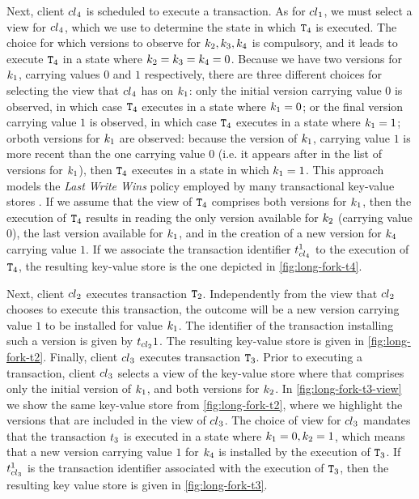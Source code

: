 Next, client ${cl}_4$ is scheduled to execute a transaction. As for ${cl}_1$, 
we must select a view for ${cl}_4$, which we use to determine the state in which $\mathtt{T}_4$ 
is executed. The choice for which versions to observe for $k_2, k_3, k_4$ is compulsory, 
and it leads to execute $\mathtt{T}_4$ in a state where $k_2 = k_3 = k_4 = 0$.
Because we have two versions for $k_1$, carrying values $0$ and $1$ respectively, 
there are three different choices for selecting the view that ${cl}_4$ has on $k_1$: 
only the initial version carrying value $0$ is observed, in which case $\mathtt{T}_4$ executes in 
a state where $k_1 = 0$; or the final version carrying value $1$ is observed, in which 
case $\mathtt{T}_4$ executes in a state where $k_1 = 1$; orboth versions for 
$k_1$ are observed: because the version of $k_1$, carrying value $1$ is more recent than the one 
carrying value $0$ (i.e. it appears after in the list of versions for $k_1$), then $\mathtt{T}_4$ 
executes in a state in which $k_1 = 1$. This approach models the \emph{Last Write Wins} 
policy employed by many transactional key-value stores \cite{cassandra,...........}. If we assume that the view 
of $\mathtt{T}_4$ comprises both versions for $k_1$, then the execution of $\mathtt{T}_4$ 
results in reading the only version available for $k_2$ (carrying value $0$), the last version available 
for $k_1$, and in the creation of a new version for $k_4$ carrying value $1$. If we associate 
the transaction identifier $\txid_{\cl_{4}}^1$ to the execution of $\mathtt{T}_4$, the resulting 
key-value store is the one depicted in \cref{fig:long-fork-t4}.

Next, client ${cl}_2$ executes transaction $\mathtt{T}_2$. Independently from the view that 
${cl}_2$ chooses to execute this transaction, the outcome will be a new version carrying 
value $1$ to be installed for value $k_1$. The identifier of the transaction installing such 
a version is given by $\txid_{\cl_2}{1}$. The resulting key-value store is given in \cref{fig:long-fork-t2}. 
Finally, client ${cl}_3$ executes transaction $\mathtt{T}_3$. Prior to executing a transaction, client 
${cl}_3$ selects a view of the key-value store where that comprises only the initial version of $k_1$, 
and both versions for $k_2$. In \cref{fig:long-fork-t3-view} we show the same key-value store from \cref{fig:long-fork-t2},  
where we highlight the versions that are included in the view of ${cl}_3$. The choice of view for ${cl}_3$ 
mandates that the transaction $\txid_3$ is executed in a state where $k_1 = 0, k_2 = 1$, which 
means that a new version carrying value $1$ for $k_4$ is installed by the execution of $\mathtt{T}_3$. 
If $\txid_{\cl_3}^{1}$ is the transaction identifier associated with the execution of $\mathtt{T}_3$, then the resulting 
key value store is given in \cref{fig:long-fork-t3}.

